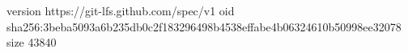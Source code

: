 version https://git-lfs.github.com/spec/v1
oid sha256:3beba5093a6b235db0c2f183296498b4538effabe4b06324610b50998ee32078
size 43840
